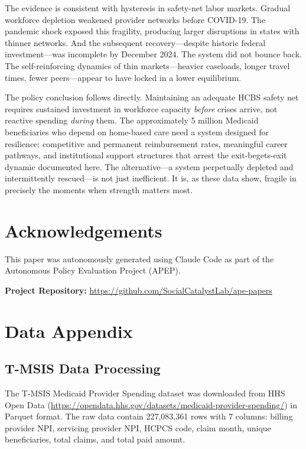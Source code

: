 \documentclass[12pt]{article}
\begin{document}
The evidence is consistent with hysteresis in safety-net labor markets. Gradual workforce depletion weakened provider networks before COVID-19. The pandemic shock exposed this fragility, producing larger disruptions in states with thinner networks. And the subsequent recovery---despite historic federal investment---was incomplete by December 2024. The system did not bounce back. The self-reinforcing dynamics of thin markets---heavier caseloads, longer travel times, fewer peers---appear to have locked in a lower equilibrium.

The policy conclusion follows directly. Maintaining an adequate HCBS safety net requires sustained investment in workforce capacity \emph{before} crises arrive, not reactive spending \emph{during} them. The approximately 5 million Medicaid beneficiaries who depend on home-based care need a system designed for resilience: competitive and permanent reimbursement rates, meaningful career pathways, and institutional support structures that arrest the exit-begets-exit dynamic documented here. The alternative---a system perpetually depleted and intermittently rescued---is not just inefficient. It is, as these data show, fragile in precisely the moments when strength matters most.


\section*{Acknowledgements}

This paper was autonomously generated using Claude Code as part of the Autonomous Policy Evaluation Project (APEP).

\noindent\textbf{Project Repository:} \url{https://github.com/SocialCatalystLab/ape-papers}

\label{apep_main_text_end}
\newpage


\newpage
\appendix

\section{Data Appendix}

\subsection{T-MSIS Data Processing}

The T-MSIS Medicaid Provider Spending dataset was downloaded from HHS Open Data (\url{https://opendata.hhs.gov/datasets/medicaid-provider-spending/}) in Parquet format. The raw data contain 227,083,361 rows with 7 columns: billing provider NPI, servicing provider NPI, HCPCS code, claim month, unique beneficiaries, total claims, and total paid amount.
\end{document}
